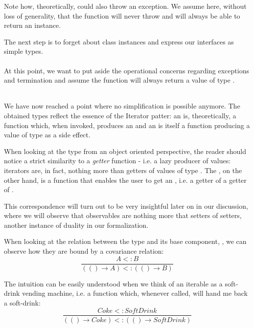 Note how, theoretically,  could also throw an exception. We assume here, without loss of generality, that the function will never throw and will always be able to return an  instance.

The next step is to forget about class instances and express our interfaces as simple types.\\

\\

At this point, we want to put aside the operational concerns regarding exceptions and termination and assume the  function will always return a value of type .

\\

We have now reached a point where no simplification is possible anymore. The obtained types reflect the essence of the Iterator patter: an  is, theoretically, a function which, when invoked, produces an  and an  is itself a function producing a value of type  as a side effect. 

When looking at the  type from an object oriented perspective, the reader should notice a strict similarity to a \textit{getter} function - i.e. a lazy producer of values: iterators are, in fact, nothing more than getters of values of type . The , on the other hand, is a function that enables the user to get an , i.e. a getter of a getter of .

This correspondence will turn out to be very insightful later on in our discussion, where we will observe that observables are nothing more that setters of setters, another instance of duality in our formalization. 

When looking at the relation between the  type and its base component, , we can observe how they are bound by a covariance relation:\\
\begin{displaymath}
\frac{A <: B}{(() \rightarrow A) <: (() \rightarrow B)} 
\end{displaymath}

The intuition can be easily understood when we think of an iterable as a soft-drink vending machine, i.e. a function which, whenever called, will hand me back a soft-drink:\\ 
\begin{displaymath}
\frac{Coke <: Soft Drink}{(() \rightarrow Coke) <: (() \rightarrow Soft Drink)} 
\end{displaymath}

